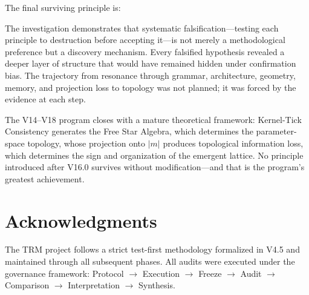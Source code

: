 \documentclass[11pt,a4paper,oneside]{report}
\begin{document}
The final surviving principle is:

\begin{center}
\end{center}

\vspace{8pt}

The investigation demonstrates that systematic falsification---testing each
principle to destruction before accepting it---is not merely a methodological
preference but a discovery mechanism. Every falsified hypothesis revealed
a deeper layer of structure that would have remained hidden under confirmation
bias. The trajectory from resonance through grammar, architecture, geometry,
memory, and projection loss to topology was not planned; it was forced by
the evidence at each step.

The V14--V18 program closes with a mature theoretical framework:
Kernel-Tick Consistency generates the Free Star Algebra, which determines
the parameter-space topology, whose projection onto $|m|$ produces
topological information loss, which determines the sign and organization
of the emergent lattice. No principle introduced after V16.0 survives
without modification---and that is the program's greatest achievement.

\chapter*{Acknowledgments}

The TRM project follows a strict test-first methodology formalized in V4.5
and maintained through all subsequent phases. All audits were executed under
the governance framework: Protocol $\rightarrow$ Execution $\rightarrow$
Freeze $\rightarrow$ Audit $\rightarrow$ Comparison $\rightarrow$
Interpretation $\rightarrow$ Synthesis.
\end{document}
